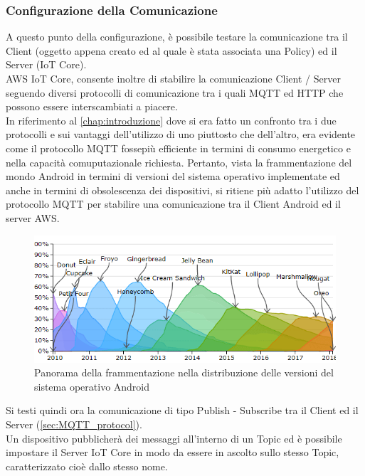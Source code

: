 \subsubsection{Configurazione della Comunicazione}
\label{subsubsec:com}
A questo punto della configurazione, è possibile testare la comunicazione tra il Client (oggetto appena creato ed al quale è stata associata una Policy) ed il Server (IoT Core). \\
AWS IoT Core, consente inoltre di stabilire la comunicazione Client / Server seguendo diversi protocolli di comunicazione tra i quali MQTT ed HTTP che possono essere interscambiati a piacere.\\
In riferimento al \autoref{chap:introduzione} dove si era fatto un confronto tra i due protocolli e sui vantaggi dell'utilizzo di uno piuttosto che dell'altro, era evidente come il protocollo MQTT fossepiù efficiente in termini di consumo energetico e nella capacità comuputazionale richiesta. Pertanto, vista la frammentazione del mondo Android in termini di versioni del sistema operativo implementate ed anche in termini di obsolescenza dei dispositivi, si ritiene più adatto l'utilizzo del protocollo MQTT per stabilire una comunicazione tra il Client Android ed il server AWS.\\
\begin{figure}
	\begin{center}
		\includegraphics[width=0.9\columnwidth]{images/android_fragmentation}
	\end{center}
	\caption{Panorama della frammentazione nella distribuzione delle versioni del sistema operativo Android}
	\label{fig:android_fragmentation}
\end{figure}
Si testi quindi ora la comunicazione di tipo Publish - Subscribe tra il Client ed il Server (\autoref{sec:MQTT_protocol}).\\
Un dispositivo pubblicherà dei messaggi all'interno di un Topic ed è possibile impostare il Server IoT Core in modo da essere in ascolto sullo stesso Topic, caratterizzato cioè dallo stesso nome.\\

